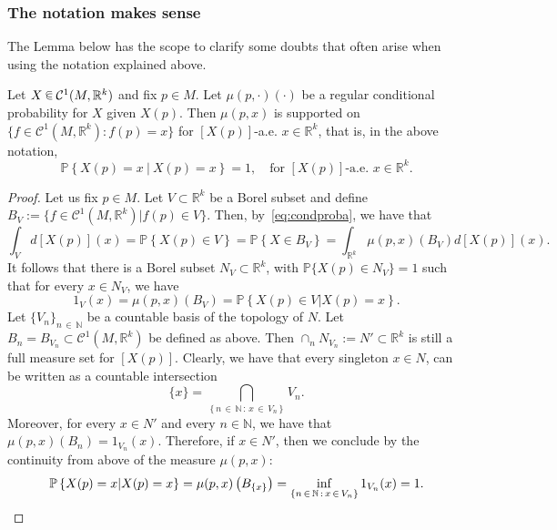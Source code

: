 \documentclass[AHL, Unicode, longabstracts, published]{cedram}
\newcommand{\R}{\mathbb{R}}
\newcommand{\N}{\mathbb{N}}
\newcommand{\PP}{\mathbb{P}}
\newcommand{\mC}{\mathcal{C}}
\newcommand*\randin{
\mathchoice {\raisebox{-.35ex}{$\displaystyle{^\subset}$}\mkern-11.5mu\raisebox{+.45ex}{$\displaystyle{_\subset}$}} {\mkern+1mu\raisebox{-.27ex}{$\textstyle{^\subset}$}\mkern-11.7mu\raisebox{+.45ex}{$\textstyle{_\subset}$}} {\raisebox{.35ex}{$\scriptstyle\subset$}\mkern-14mu\raisebox{-.15ex}{$\scriptstyle\subset$}} {\raisebox{.3ex}{$\scriptscriptstyle\subset$}\mkern-13.5mu\raisebox{-.10ex}{$\scriptscriptstyle\subset$}}}
\begin{document}
\subsubsection{The notation makes sense}

The Lemma below has the scope to clarify some doubts that often arise when using the notation explained above.

\begin{lemm}\label{lem:stupidconditioning}
Let $X\,\randin\, \mC^1(M,\R^k)$ and fix $p\in M$. Let $\mu(p,\cdot)(\cdot)$ be a regular conditional probability for $X$ given $X(p)$. Then $\mu(p,x)$ is supported on $\{f\in \mC^1(M,\R^k)\colon f(p)=x\}$ for $[X(p)]$-a.e. $x\in \R^k$, that is, in the above notation,
\begin{equation*}
\PP\left\{ X(p)=x \ \Big|\ X(p)=x\right\}=1,\quad \text{for $[X(p)]$-a.e. $x\in \R^k$.}
\end{equation*}
\end{lemm}

\begin{proof}
Let us fix $p\in M$. Let $V\subset \R^k$ be a Borel subset and define $B_V:=\{f\in\mC^1(M,\R^k)|f(p)\in V\}$. Then, by~\cref{eq:condproba}, we have that
\begin{equation*}
\int_{V}d[X(p)](x)=
\PP\left\{ X(p)\in V\right\}=\PP\left\{ X\in B_V\right\} =\int_{\R^k}\mu(p,x)(B_V)d[X(p)](x).
\end{equation*}
It follows that there is a Borel subset $N_V\subset \R^k$, with $\PP\{X(p)\in N_V\}=1$ such that for every $x\in N_V$, we have
\begin{equation*}
1_V(x)=\mu(p,x)(B_V)=\PP\left\{ X(p)\in V|X(p)=x\right\}.
\end{equation*}
Let $\{V_n\}_{n\,\in\,\N}$ be a countable basis of the topology of $N$. Let $B_n=B_{V_n}\subset \mC^1(M,\R^k)$ be defined as above. Then $\cap_n N_{V_n}:=N'\subset \R^k$ is still a full measure set for $[X(p)]$. Clearly, we have that every singleton $x\in N$, can be written as a countable intersection
\begin{equation*}
\{x\}=\bigcap_{\left\{ n\,\in\,\N\, :\, x\,\in\,V_n\right\}}V_n.
\end{equation*}
Moreover, for every $x\in N'$ and every $n\in\N$, we have that $\mu(p,x)(B_n)=1_{V_n}(x)$. Therefore, if $x\in N'$, then we conclude by the continuity from above of the measure $\mu(p,x)$:
\begin{equation*}
\PP\left\{ X(p)=x|X(p)= x \right\}=\mu(p,x)\left( B_{\left\{ x\right\}}\right)=\inf_{\left\{n\,\in\,\N\,:\, x\,\in\,V_n\right\}} 1_{V_n}(x)=1.\qedhere
\end{equation*}
\end{proof}
\end{document}
